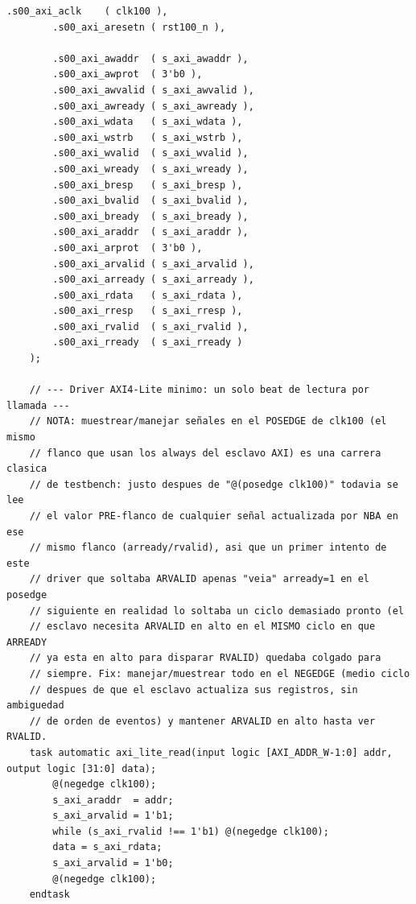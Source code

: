 \begin{lstlisting}[style=verilogstyle, basicstyle=\ttfamily\footnotesize, caption={Código fuente del subsistema \texttt{tb\_ibex\_bram\_subsystem.sv}}, label={code:tb_ibex_bram_subsystem.sv}]
        .s00_axi_aclk    ( clk100 ),
        .s00_axi_aresetn ( rst100_n ),

        .s00_axi_awaddr  ( s_axi_awaddr ),
        .s00_axi_awprot  ( 3'b0 ),
        .s00_axi_awvalid ( s_axi_awvalid ),
        .s00_axi_awready ( s_axi_awready ),
        .s00_axi_wdata   ( s_axi_wdata ),
        .s00_axi_wstrb   ( s_axi_wstrb ),
        .s00_axi_wvalid  ( s_axi_wvalid ),
        .s00_axi_wready  ( s_axi_wready ),
        .s00_axi_bresp   ( s_axi_bresp ),
        .s00_axi_bvalid  ( s_axi_bvalid ),
        .s00_axi_bready  ( s_axi_bready ),
        .s00_axi_araddr  ( s_axi_araddr ),
        .s00_axi_arprot  ( 3'b0 ),
        .s00_axi_arvalid ( s_axi_arvalid ),
        .s00_axi_arready ( s_axi_arready ),
        .s00_axi_rdata   ( s_axi_rdata ),
        .s00_axi_rresp   ( s_axi_rresp ),
        .s00_axi_rvalid  ( s_axi_rvalid ),
        .s00_axi_rready  ( s_axi_rready )
    );

    // --- Driver AXI4-Lite minimo: un solo beat de lectura por llamada ---
    // NOTA: muestrear/manejar señales en el POSEDGE de clk100 (el mismo
    // flanco que usan los always del esclavo AXI) es una carrera clasica
    // de testbench: justo despues de "@(posedge clk100)" todavia se lee
    // el valor PRE-flanco de cualquier señal actualizada por NBA en ese
    // mismo flanco (arready/rvalid), asi que un primer intento de este
    // driver que soltaba ARVALID apenas "veia" arready=1 en el posedge
    // siguiente en realidad lo soltaba un ciclo demasiado pronto (el
    // esclavo necesita ARVALID en alto en el MISMO ciclo en que ARREADY
    // ya esta en alto para disparar RVALID) quedaba colgado para
    // siempre. Fix: manejar/muestrear todo en el NEGEDGE (medio ciclo
    // despues de que el esclavo actualiza sus registros, sin ambiguedad
    // de orden de eventos) y mantener ARVALID en alto hasta ver RVALID.
    task automatic axi_lite_read(input logic [AXI_ADDR_W-1:0] addr, output logic [31:0] data);
        @(negedge clk100);
        s_axi_araddr  = addr;
        s_axi_arvalid = 1'b1;
        while (s_axi_rvalid !== 1'b1) @(negedge clk100);
        data = s_axi_rdata;
        s_axi_arvalid = 1'b0;
        @(negedge clk100);
    endtask


\end{lstlisting}
